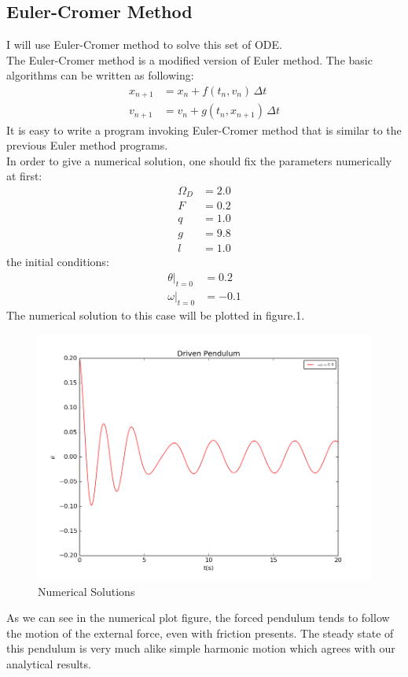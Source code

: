 \documentclass[10pt,a4paper]{article}
\begin{document}
    \subsection{Euler-Cromer Method}
    I will use Euler-Cromer method to solve this set of ODE.\\
    The Euler-Cromer method is a modified version of Euler method. The basic algorithms can be written as following:
    \begin{align}
    x_{n+1} &= x_n + f(t_n, v_n) \, \Delta t\\
    v_{n+1} &= v_n + g(t_n, x_{n+1}) \, \Delta t
    \end{align}
    It is easy to write a program invoking Euler-Cromer method that is similar to the previous Euler method programs.\\
    In order to give a numerical solution, one should fix the parameters numerically at first:
    \begin{align}
    \Omega_D&=2.0\\
    F&=0.2\\
    q&=1.0\\
    g&=9.8\\
    l&=1.0
    \end{align}
    the initial conditions:
    \begin{align}
    \theta|_{t=0}&=0.2\\
    \omega|_{t=0}&=-0.1
    \end{align}     
    The numerical solution to this case will be plotted in figure.1.
    \begin{figure}[htbp]
    	\centering
    	\includegraphics[width=5in]{pendulum_1.png}
    	\caption{Numerical Solutions}
    \end{figure}
    As we can see in the numerical plot figure, the forced pendulum tends to follow the motion of the external force, even with friction presents. The steady state of this pendulum is very much alike simple harmonic motion which agrees with our analytical results.\\
\end{document}
